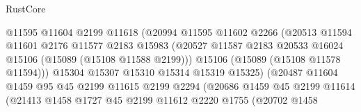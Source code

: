\begin{lexlean}{RustCore}
\begin{coremodule}
                                      @11595
                                      @11604
                                      @2199
                                      @11618
                                      (@20994
                                        @11595
                                        @11602
                                        @2266
                                        (@20513
                                          @11594
                                          @11601
                                          @2176
                                          @11577
                                          @2183
                                          @15983
                                          (@20527
                                            @11587
                                            @2183
                                            @20533
                                            @16024
                                            @15106
                                            (@15089 (@15108 @11588 @2199)))
                                          @15106
                                          (@15089 (@15108 @11578 @11594)))
                                        @15304
                                        @15307
                                        @15310
                                        @15314
                                        @15319
                                        @15325)
                                      (@20487
                                        @11604
                                        @1459
                                        @95
                                        @45
                                        @2199
                                        @11615
                                        @2199
                                        @2294
                                        (@20686
                                          @1459
                                          @45
                                          @2199
                                          @11614
                                          (@21413
                                            @1458
                                            @1727
                                            @45
                                            @2199
                                            @11612
                                            @2220
                                            @1755
                                            (@20702
                                              @1458

\end{coremodule}
\end{lexlean}
